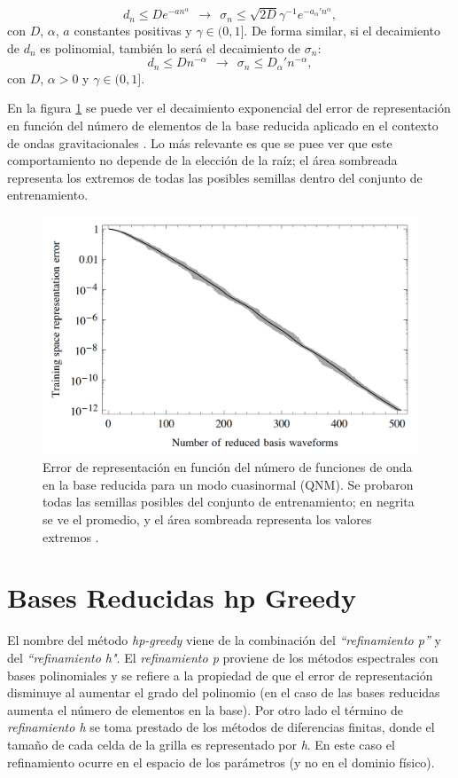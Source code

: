\[
d_n \leq De^{-an^{\alpha}} \ \ \rightarrow \ \ \sigma_n \leq \sqrt{2D} \gamma^{-1} e^{-a_{\alpha}'n^{\alpha}},
\]
con $D$, $\alpha$, $a$ constantes positivas y $\gamma \in (0,1]$.
De forma similar, si el decaimiento de $d_n$ es polinomial, también lo será el decaimiento de $\sigma_n$:
\[
d_n \leq D n^{-\alpha} \ \ \rightarrow \ \ \sigma_n \leq D_{\alpha}'n^{-\alpha},
\]
con $D$, $\alpha > 0$ y $\gamma \in (0, 1]$.

En la figura \ref{fig:rb_vs_n} se puede ver el decaimiento exponencial del error de representación en función del número de elementos de la base reducida aplicado en el contexto de ondas gravitacionales \cite{Caudill_2012}. Lo más relevante es que se puee ver que este comportamiento no depende de la elección de la raíz; el área sombreada representa los extremos de todas las posibles semillas dentro del conjunto de entrenamiento.


\begin{figure}[h!]
\centering
\includegraphics[width=.8\columnwidth]{figs/rb_vs_n.png}
\caption{Error de representación en función del número de funciones de onda en la base reducida para un modo cuasinormal (QNM). Se probaron todas las semillas posibles del conjunto de entrenamiento; en negrita se ve el promedio, y el área sombreada representa los valores extremos \cite{Caudill_2012}.}
\label{fig:rb_vs_n}
\end{figure}

\section{Bases Reducidas hp Greedy}

El nombre del método \textit{hp-greedy} \cite{Cerino:2022dhr} viene de la combinación del \textit{``refinamiento p''} y del \textit{``refinamiento h"}. El \textit{refinamiento p} proviene de los métodos espectrales con bases polinomiales \cite{hesthaven_gottlieb_gottlieb_2007} y se refiere a la propiedad de que el error de representación disminuye al aumentar el grado del polinomio (en el caso de las bases reducidas aumenta el número de elementos en la base). Por otro lado el término de \textit{refinamiento h} se toma prestado de los métodos de diferencias finitas, donde el tamaño de cada celda de la grilla es representado por \textit{h}. En este caso el refinamiento ocurre en el espacio de los parámetros (y no en el dominio físico).

